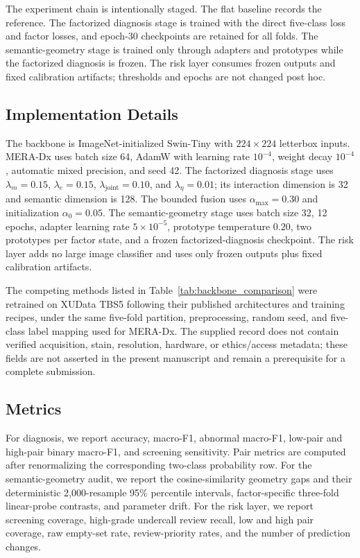 \documentclass[conference]{IEEEtran}
\begin{document}
The experiment chain is intentionally staged. The flat baseline records
the reference. The factorized diagnosis stage is trained with the direct
five-class loss and factor losses, and epoch-30 checkpoints are retained
for all folds. The semantic-geometry stage is trained only through
adapters and prototypes while the factorized diagnosis is frozen. The
risk layer consumes frozen outputs and fixed calibration artifacts;
thresholds and epochs are not changed post hoc.

\subsection{Implementation Details}
\label{sec:implementation}
The backbone is ImageNet-initialized Swin-Tiny with $224\times224$
letterbox inputs. MERA-Dx uses batch size 64, AdamW with learning rate
$10^{-4}$, weight decay $10^{-4}$, automatic mixed precision, and seed 42.
The factorized diagnosis stage uses $\lambda_m=0.15$, $\lambda_e=0.15$,
$\lambda_{\mathrm{joint}}=0.10$, and $\lambda_{\eta}=0.01$; its
interaction dimension is 32 and semantic dimension is 128. The bounded
fusion uses $\alpha_{\max}=0.30$ and initialization $\alpha_0=0.05$. The
semantic-geometry stage uses batch size 32, 12 epochs, adapter learning
rate $5\times10^{-5}$, prototype temperature $0.20$, two prototypes per
factor state, and a frozen factorized-diagnosis checkpoint. The risk
layer adds no large image classifier and uses only frozen outputs plus
fixed calibration artifacts.

The competing methods listed in Table~\ref{tab:backbone_comparison} were
retrained on XUData TBS5 following their published architectures and training
recipes, under the same five-fold partition, preprocessing, random seed, and
five-class label mapping used for MERA-Dx.
The supplied record does not contain verified acquisition, stain, resolution,
hardware, or ethics/access metadata; these fields are not asserted in the
present manuscript and remain a prerequisite for a complete submission.

\subsection{Metrics}
For diagnosis, we report accuracy, macro-F1, abnormal macro-F1, low-pair
and high-pair binary macro-F1, and screening sensitivity. Pair metrics
are computed after renormalizing the corresponding two-class probability
row. For the semantic-geometry audit, we report the cosine-similarity
geometry gaps and their deterministic 2,000-resample 95\% percentile
intervals, factor-specific three-fold linear-probe contrasts, and
parameter drift. For the risk layer, we report screening coverage,
high-grade undercall review recall, low and high pair coverage, raw
empty-set rate, review-priority rates, and the number of prediction
changes.
\end{document}

